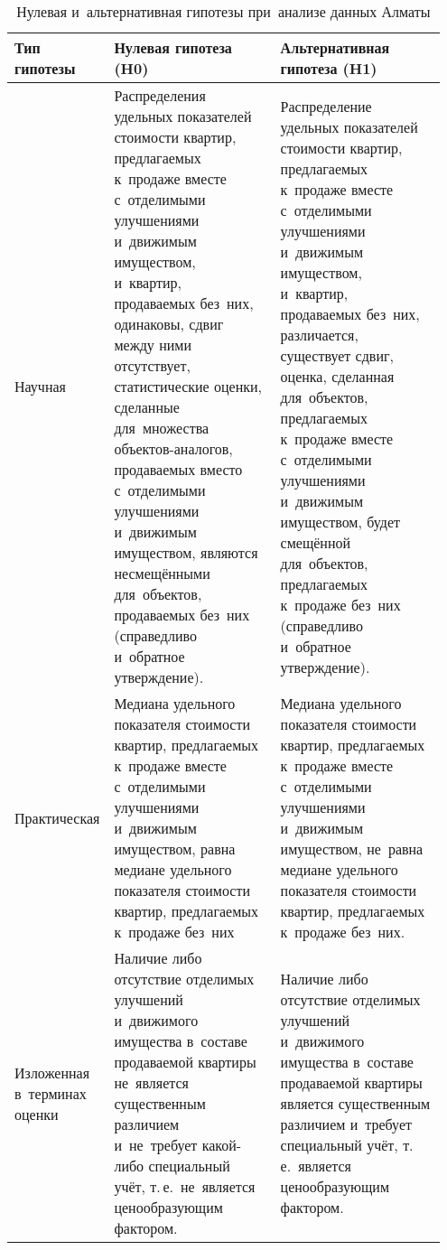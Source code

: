 \documentclass[]{scrreprt}
\begin{document}
\begin{table}[ht]
	\caption{Нулевая и~альтернативная гипотезы при~анализе данных Алматы}  \label{tab:nul-alt-hypothesis-almaty}
	\centering
	\begin{tabularx}{\textwidth}{p{0.15\linewidth} p{0.4\linewidth} p{0.4\linewidth}} 
		\hline
		Тип гипотезы&Нулевая гипотеза (H0)&Альтернативная гипотеза (H1)\\
		\hline
		Научная&Распределения удельных показателей стоимости квартир, предлагаемых к~продаже вместе с~отделимыми улучшениями и~движимым имуществом, и~квартир, продаваемых без~них, одинаковы, сдвиг между ними отсутствует, статистические оценки, сделанные для~множества объектов-аналогов, продаваемых вместо с~отделимыми улучшениями и~движимым имуществом, являются несмещёнными для~объектов, продаваемых без~них (справедливо и~обратное утверждение).&Распределение удельных показателей стоимости квартир, предлагаемых к~продаже вместе с~отделимыми улучшениями и~движимым имуществом, и~квартир, продаваемых без~них, различается, существует сдвиг, оценка, сделанная для~объектов, предлагаемых к~продаже вместе с~отделимыми улучшениями и~движимым имуществом, будет смещённой для~объектов, предлагаемых к~продаже без~них (справедливо и~обратное утверждение).\\
		\hline
		Практическая&Медиана удельного показателя стоимости квартир, предлагаемых к~продаже вместе с~отделимыми улучшениями и~движимым имуществом, равна медиане удельного показателя стоимости квартир, предлагаемых к~продаже без~них&Медиана удельного показателя стоимости квартир, предлагаемых к~продаже вместе с~отделимыми улучшениями и~движимым имуществом, не~равна медиане удельного показателя стоимости квартир, предлагаемых к~продаже без~них.\\
		\hline
		Изложенная в~терминах оценки&Наличие либо отсутствие отделимых улучшений и~движимого имущества в~составе продаваемой квартиры не~является существенным различием и~не~требует какой-либо специальный учёт, т.\,е.~не~является ценообразующим фактором.&Наличие либо отсутствие отделимых улучшений и~движимого имущества в~составе продаваемой квартиры является существенным различием и~требует специальный учёт, т.\,е.~является ценообразующим фактором.\\
		\hline
	\end{tabularx}
\end{table}
\end{document}
